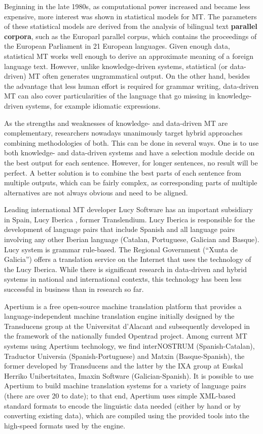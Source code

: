 \begin{multicols}{2}
Beginning in the late 1980s, as computational power increased and became less expensive, more interest was shown in statistical models for MT. The parameters of these statistical models are derived from the analysis of bilingual text \textbf{parallel corpora}, such as the Europarl parallel corpus, which contains the proceedings of the European Parliament in 21 European languages. Given enough data, statistical MT works well enough to derive an approximate meaning of a foreign language text. However, unlike knowledge-driven systems, statistical (or data-driven) MT often generates ungrammatical output. On the other hand, besides the advantage that less human effort is required for grammar writing, data-driven MT can also cover particularities of the language that go missing in knowledge-driven systems, for example idiomatic expressions. 

As the strengths and weaknesses of knowledge- and data-driven MT are complementary, researchers nowadays unanimously target hybrid approaches combining methodologies of both. This can be done in several ways. One is to use both knowledge- and data-driven systems and have a selection module decide on the best output for each sentence. However, for longer sentences, no result will be perfect. A better solution is to combine the best parts of each sentence from multiple outputs, which can be fairly complex, as corresponding parts of multiple alternatives are not always obvious and need to be aligned. 

Leading international MT developer Lucy Software has an important subsidiary in Spain, Lucy Iberica \cite{GAL-Nota31}, former Translendium. Lucy Iberica is responsible for the development of language pairs that include Spanish and all language pairs involving any other Iberian language (Catalan, Portuguese, Galician and Basque). Lucy system is grammar rule-based. The Regional Government (“Xunta de Galicia”) \cite{GAL-Nota32} offers a translation service on the Internet that uses the technology of the Lucy Iberica.   While there is significant research in data-driven and hybrid systems in national and international contexts, this technology has been less successful in business than in research so far.

Apertium is a free open-source machine translation platform that provides a language-independent machine translation engine initially designed by the Transducens group at the Universitat d'Alacant and subsequently developed in the framework of the nationally funded Opentrad project. Among current MT systems using Apertium technology, we find interNOSTRUM (Spanish-Catalan), Traductor Universia (Spanish-Portuguese) and Matxin (Basque-Spanish), the former developed by Transducens and the latter by the IXA group \cite{GAL-Nota33} at Euskal Herriko Unibertsitatea, Imaxin Software (Galician-Spanish). It is possible to use Apertium to build machine translation systems for a variety of language pairs (there are over 20 to date); to that end, Apertium uses simple XML-based standard formats to encode the linguistic data needed (either by hand or by converting existing data), which are compiled using the provided tools into the high-speed formats used by the engine.


\end{multicols}
